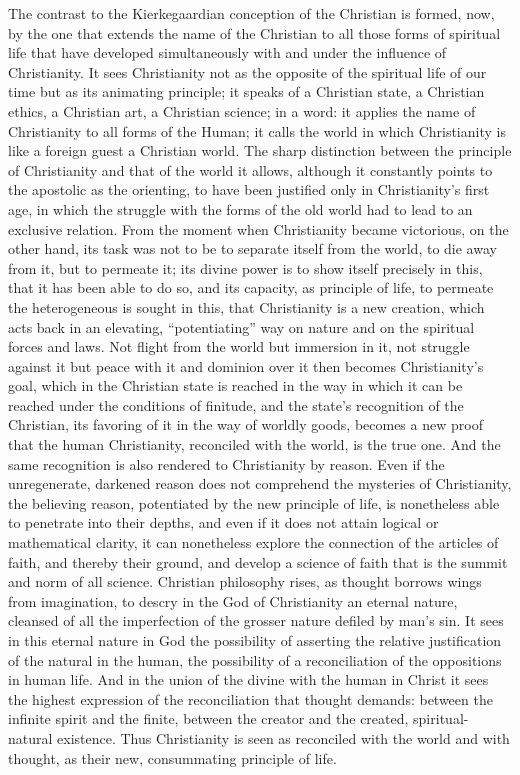 \documentclass[12pt,a4paper,openany]{book}
\newcommand{\opage}[1]{\marginnote{\footnotesize\textit{[#1]}}}
\begin{document}
The contrast to the Kierkegaardian conception of the Christian
is formed, now, by the one that extends the name of the Christian to
all those forms of spiritual life that have developed simultaneously
with and under the influence of Christianity. It
sees Christianity not as the opposite of the spiritual life of our time
but as its animating principle; it speaks
of a Christian state, a Christian ethics, a Christian art,
a Christian science; in a word: it applies the name of Christianity
to all forms of the Human; it calls
the world in which Christianity is like a foreign
guest a Christian world. The sharp distinction between
the principle of Christianity and that of the world it allows, although it
constantly points to the apostolic as the orienting,
to have been justified only in Christianity's first age, in which
the struggle with the forms of the old world had to lead to an
exclusive relation. From the moment when Christianity became
victorious, on the other hand, its task was not to be to separate
itself from the world, to die away from it, but to permeate
it; its divine power is to show itself precisely in this, that
it has been able to do so, and its capacity, as principle of life,
to permeate the heterogeneous is sought in this, that Christianity
is a new creation, which acts back in an elevating, ``potentiating'' way
on nature and on the spiritual forces and
laws. Not flight from the world but immersion in it, not
struggle against it but peace with it and dominion over
it then becomes Christianity's goal, which in the Christian state
is reached in the way in which it can be reached under the conditions of finitude,
and the state's recognition of the Christian, its favoring
of it in the way of worldly goods, becomes a new
proof that the human Christianity, reconciled with the world,
is the true one. And the same recognition is also rendered
\opage{439}to Christianity by reason. Even if the unregenerate, darkened
reason does not comprehend the mysteries of Christianity,
the believing reason, potentiated by the new principle of life, is nonetheless
able to penetrate into their depths, and even if it does not
attain logical or mathematical clarity, it can nonetheless explore
the connection of the articles of faith, and thereby their
ground, and develop a science of faith that is the
summit and norm of all science. Christian philosophy rises, as
thought borrows wings from imagination, to descry in the God of Christianity
an eternal nature, cleansed of all the imperfection of the grosser nature
defiled by man's sin.
It sees in this eternal nature in God the possibility of
asserting the relative justification of the natural in the human,
the possibility of a reconciliation of the oppositions in human life. And
in the union of the divine with the human in
Christ it sees the highest expression of the reconciliation that thought
demands: between the infinite spirit and the finite, between
the creator and the created, spiritual-natural existence. Thus
Christianity is seen as reconciled with the world and with
thought, as their new, consummating principle of life.
\end{document}
